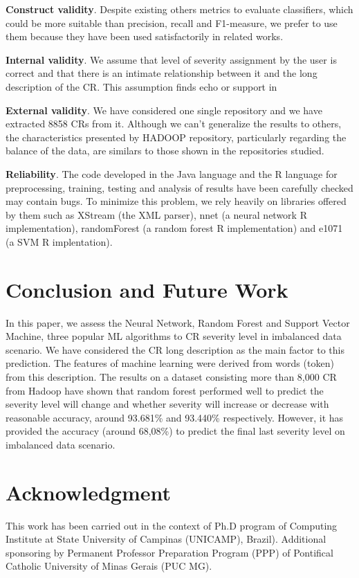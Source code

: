 \documentclass[10pt, conference]{IEEEtran}
\begin{document}
\textbf{Construct validity}. Despite existing others metrics to evaluate classifiers\cite{Facelli2015}, which could be more suitable than precision, recall and F1-measure, we prefer to use them because they have been used satisfactorily in related works\cite{Menzies2008, Lamkanfi2010, Lamkanfi2011, ValdiviaGarcia2014}.


\textbf{Internal validity}. We assume that level of severity assignment by the user is correct and that there is an intimate relationship between it and the long description of the CR. This assumption finds echo or support in \cite{Lamkanfi2010, Tian2012}

\textbf{External validity}. We have considered one single repository and we have extracted 8858 CRs from it. Although we can't generalize the results to others, the characteristics presented by HADOOP repository, particularly regarding the balance of the data, are similars to those shown in the repositories studied\cite{Lamkanfi2010, Lamkanfi2011, Tian2012,ValdiviaGarcia2014}.

\textbf{Reliability}. The code developed in the Java language and the R language for preprocessing, training, testing and analysis of results have been carefully checked may contain bugs. To minimize this problem, we rely heavily on libraries offered by them such as XStream (the XML parser), nnet (a neural network R implementation), randomForest (a random forest R implementation) and e1071 (a SVM R implentation). 

\section{Conclusion and Future Work} \label{sec:conclusion}
In this paper, we assess the Neural Network, Random Forest and Support Vector Machine, three popular ML algorithms to CR severity level in imbalanced data scenario. We have considered the CR long description as the main factor to
this prediction. The features of machine learning were derived from
words (token) from this description. The results on a dataset consisting more than
8,000 CR from Hadoop have shown that random forest performed well to predict the severity level will change and whether severity will increase or decrease with reasonable accuracy, around 93.681\% and 93.440\% respectively. However, it has provided the accuracy (around 68,08\%) to predict the final last severity level on imbalanced data scenario.

\section*{Acknowledgment}
This work has been carried out in the context of Ph.D program of  Computing Institute at State University of Campinas (UNICAMP), Brazil). Additional sponsoring by Permanent Professor Preparation Program (PPP) of Pontifical Catholic University of Minas Gerais (PUC MG). 
\end{document}
